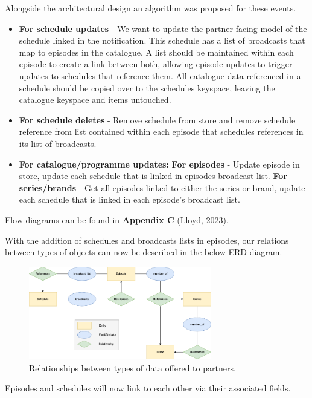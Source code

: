     Alongside the architectural design an algorithm was proposed for these events.
    \begin{itemize}
      \item \textbf{For schedule updates} - We want to update the partner facing model of the schedule linked in the notification. This schedule has a 
      list of broadcasts that map to episodes in the catalogue. A list should be maintained within each episode to create a link between both, allowing episode 
      updates to trigger updates to schedules that reference them. All catalogue data referenced in a schedule should be copied over to the schedules keyspace,
      leaving the catalogue keyspace and items untouched.
      \item \textbf{For schedule deletes} - Remove schedule from store and remove schedule reference from list contained within each episode that schedules 
      references in its list of broadcasts.
      \item \textbf{For catalogue/programme updates:}
        \subitem \textbf{For episodes} - Update episode in store, update each schedule that is linked in episodes broadcast list.
        \subitem \textbf{For series/brands} - Get all episodes linked to either the series or brand, update each schedule that is linked in each episode's 
        broadcast list.
    \end{itemize}

    Flow diagrams can be found in \hyperref[sec:AppendixC]{\textbf{Appendix C}} (Lloyd, 2023).

    With the addition of schedules and broadcasts lists in episodes, our relations between types of objects can now be described in the below ERD diagram.

    \begin{figure}[H]
      \centering
      \includegraphics[width=8cm]{assets/dataERD.drawio.png}
      \caption{Relationships between types of data offered to partners.}
      \label{fig:relationshipsERD}
    \end{figure}

    Episodes and schedules will now link to each other via their associated fields.

\newpage
